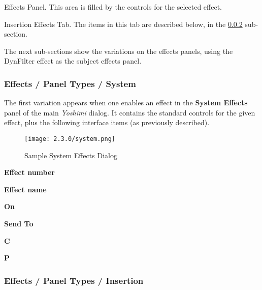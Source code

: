    Effects Panel.
   This area is filled by the controls for the selected effect.

   Insertion Effects Tab.
   The items in this tab are described below,
   in the \ref{subsubsec:effects_paneltypes_insertion}
   sub-section.

   \iffalse
   VVVV How did this get here? It's quite out of place!
   \itempar{Reports}{effects!reports}
   Effects Reports.

\begin{figure}[H]
   \centering
   \texttt{[image: effects-panel/reports.jpg]}
   \caption{Effects / Reports}
   \label{fig:effects_reports}
\end{figure}
\fi

   The next sub-sections show the variations on the effects panels, using the
   DynFilter effect as the subject effects panel.

\subsubsection{Effects / Panel Types / System }
\label{subsubsec:effects_paneltypes_system}

   The first variation
   appears when one enables an effect in the
   \textbf{System Effects}
   panel of the main \textsl{Yoshimi} dialog.  It contains the standard
   controls for the given effect, plus the following interface items
   (as previously described).

\begin{figure}[H]
   \centering
   \texttt{[image: 2.3.0/system.png]}
   \caption{Sample System Effects Dialog}
   \label{fig:sample_system_effects_dialog}
\end{figure}

   \begin{enumber}
      \item \textbf{Effect number}
      \item \textbf{Effect name}
      \item \textbf{On}
      \item \textbf{Send To}
      \item \textbf{C}
      \item \textbf{P}
   \end{enumber}

\subsubsection{Effects / Panel Types / Insertion }
\label{subsubsec:effects_paneltypes_insertion}

